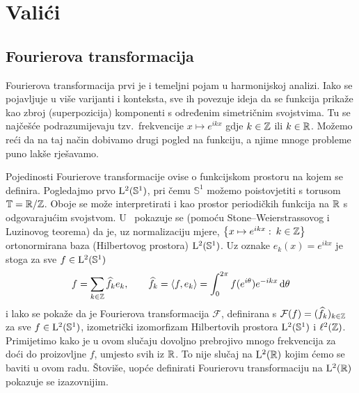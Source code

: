 \documentclass[main.tex]{subfiles}
\begin{document}
\nocite{*}

\chapter{Valići}\label{ch-ha}
\section{Fourierova transformacija}\label{sec:ha-four}
Fourierova transformacija prvi je i temeljni pojam u harmonijskoj analizi.
Iako se pojavljuje u više varijanti i konteksta, sve ih povezuje
ideja da se funkcija prikaže kao zbroj (superpozicija) komponenti s određenim simetričnim svojstvima.
Tu se najčešće podrazumijevaju tzv.\ frekvencije
\( x \mapsto e^{ikx} \) gdje \( k \in \mathbb{Z} \) ili \( k \in \mathbb{R} \).
Možemo reći da na taj način dobivamo drugi pogled na funkciju, a njime
mnoge probleme puno lakše rješavamo.

Pojedinosti Fourierove transformacije ovise o funkcijskom prostoru
na kojem se definira. Pogledajmo prvo \( \mathrm{L}^2(\mathbb S^1) \),
pri čemu \( \mathbb S^1 \) možemo poistovjetiti
s torusom \( \mathbb T = \mathbb{R}/\mathbb{Z} \). Oboje se može interpretirati
i kao prostor periodičkih funkcija na \( \mathbb{R} \) s odgovarajućim svojstvom.
U~\cite[]{gogic} pokazuje se (pomoću Stone--Weierstrassovog i Luzinovog teorema) da je, uz normalizaciju mjere,
\( \left\{ x \mapsto e^{ikx} \, \colon \, k \in \mathbb{Z} \right\} \)
ortonormirana baza (Hilbertovog prostora) \( \mathrm{L}^2(\mathbb S^1) \).
Uz oznake \( e_k(x) = e^{ikx} \) je stoga za sve \( f \in \mathrm{L}^2(\mathbb S^1) \)
\begin{equation}
	f = \sum_{k \in \mathbb{Z}} \widehat{f}_k e_k,
	\qquad \widehat{f}_k = \left\langle {f}, {e_k} \right\rangle = \int_0^{2\pi} f(e^{i\theta}) e^{-ikx} \,\mathrm d \theta
\end{equation}
i lako se pokaže da je Fourierova transformacija \( \mathcal F \),
definirana s \( \mathcal F(f) = (\widehat{f}_k)_{k \in \mathbb{Z}} \) za sve \( f \in \mathrm{L}^2(\mathbb S^1) \), izometrički izomorfizam
Hilbertovih prostora \( \mathrm{L}^2(\mathbb S^1) \) i \( \ell^2(\mathbb{Z}) \).
Primijetimo kako je u ovom slučaju dovoljno prebrojivo mnogo frekvencija za doći do
proizovljne \( f \), umjesto svih iz \( \mathbb{R} \). To nije slučaj na \( \mathrm{L}^2(\mathbb{R}) \) kojim ćemo se baviti u ovom radu.
Štoviše, uopće definirati Fourierovu transformaciju na \( \mathrm{L}^2(\mathbb{R}) \) pokazuje se izazovnijim.
\end{document}

